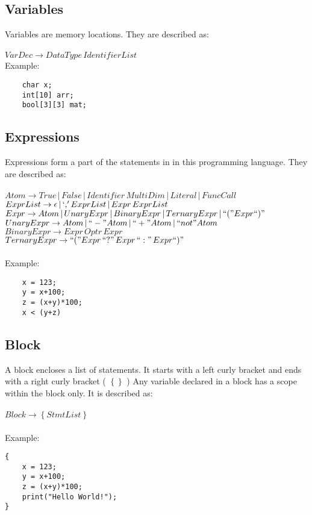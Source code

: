 \documentclass[12pt, a4paper]{article}
\begin{document}
			\subsection{Variables}
				Variables are memory locations. They are described as: \\ \\
				$ VarDec \to DataType \, IdentifierList $ \\
				
				Example:
				\begin{lstlisting}
	char x;
	int[10] arr;
	bool[3][3] mat;
				\end{lstlisting}
				
		
			\subsection{Expressions}
				Expressions form a part of the statements in in this programming language. They are described as: \\ \\
				$ Atom \to True \,|\, False \,|\, Identifier \, MultiDim \,|\, Literal \,|\, FuncCall $ \\ 
				$ExprList \to \epsilon \,|\, `,' ExprList \,|\, Expr \, ExprList$\\ 
				$ Expr \to Atom \,|\, UnaryExpr \,|\, BinaryExpr  \,|\, TernaryExpr \,|\, ``("Expr``)"$ \\ 
				$ UnaryExpr \to Atom \,|\, ``-" Atom \,|\, ``+" Atom \,|\, ``not" Atom$\\ %
				$ BinaryExpr \to Expr \,  Optr \, Expr  $ \\
				$ TernaryExpr \to ``("Expr \, ``?" \, Expr \, ``:" \, Expr``)" $ \\\\
				Example:
				\begin{lstlisting}
	x = 123;
	y = x+100;
	z = (x+y)*100;
	x < (y+z)
				\end{lstlisting}
				
			\subsection{Block}
				A block encloses a list of statements. It starts with a left curly bracket and ends with a right curly bracket ( $\left\lbrace \right\rbrace$ ) Any variable declared in a block has a scope within the block only. It is described as: \\ \\
				$ Block \to \left\lbrace StmtList \right\rbrace $ \\\\
				Example:
	\begin{lstlisting}
{
	x = 123;
	y = x+100;
	z = (x+y)*100;
	print("Hello World!");
}
	\end{lstlisting}
			
\end{document}
